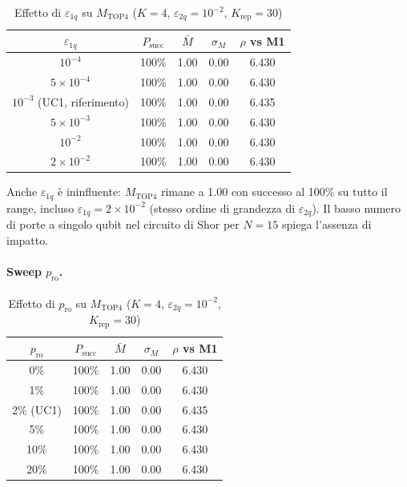 \begin{onehalfspace}
\begin{table}[H]
\centering
\caption{Effetto di $\varepsilon_{1q}$ su $M_{\text{TOP4}}$ ($K=4$, $\varepsilon_{2q}=10^{-2}$, $K_{\text{rep}}=30$)}
\label{tab:sweep_eps1q}
\begin{tabular}{ccccc}
\hline
$\varepsilon_{1q}$ & $P_{\text{succ}}$ & $\bar{M}$ & $\sigma_M$ & $\rho$ vs M1 \\
\hline
$10^{-4}$                    & 100\% & 1.00 & 0.00 & 6.430 \\
$5\times10^{-4}$             & 100\% & 1.00 & 0.00 & 6.430 \\
$10^{-3}$ (UC1, riferimento) & 100\% & 1.00 & 0.00 & 6.435 \\
$5\times10^{-3}$             & 100\% & 1.00 & 0.00 & 6.430 \\
$10^{-2}$                    & 100\% & 1.00 & 0.00 & 6.430 \\
$2\times10^{-2}$             & 100\% & 1.00 & 0.00 & 6.430 \\
\hline
\end{tabular}
\end{table}

Anche $\varepsilon_{1q}$ è ininfluente: $M_{\text{TOP4}}$ rimane a 1.00 con successo al 100\% su tutto il range, incluso $\varepsilon_{1q}=2\times10^{-2}$ (stesso ordine di grandezza di $\varepsilon_{2q}$). Il basso numero di porte a singolo qubit nel circuito di Shor per $N=15$ spiega l'assenza di impatto.

\paragraph{Sweep $p_{\text{ro}}$.}

\begin{table}[H]
\centering
\caption{Effetto di $p_{\text{ro}}$ su $M_{\text{TOP4}}$ ($K=4$, $\varepsilon_{2q}=10^{-2}$, $K_{\text{rep}}=30$)}
\label{tab:sweep_pro}
\begin{tabular}{ccccc}
\hline
$p_{\text{ro}}$ & $P_{\text{succ}}$ & $\bar{M}$ & $\sigma_M$ & $\rho$ vs M1 \\
\hline
0\%       & 100\% & 1.00 & 0.00 & 6.430 \\
1\%       & 100\% & 1.00 & 0.00 & 6.430 \\
2\% (UC1) & 100\% & 1.00 & 0.00 & 6.435 \\
5\%       & 100\% & 1.00 & 0.00 & 6.430 \\
10\%      & 100\% & 1.00 & 0.00 & 6.430 \\
20\%      & 100\% & 1.00 & 0.00 & 6.430 \\
\hline
\end{tabular}
\end{table}


\end{onehalfspace}
